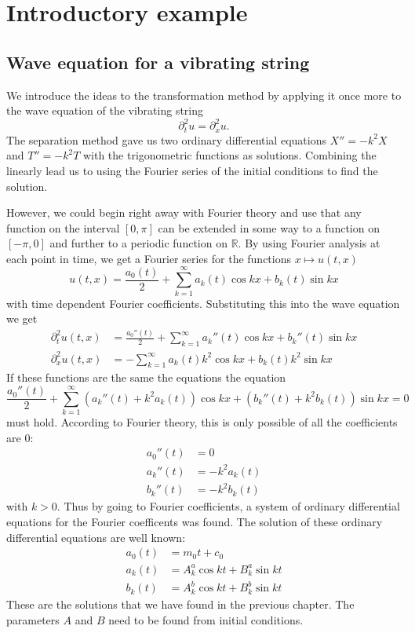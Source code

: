 %
%
%
\section{Introductory example}
\subsection{Wave equation for a vibrating string}
We introduce the ideas to the transformation method by applying it
once more to the wave equation of the vibrating string
\[
\partial_t^2u=\partial_x^2u.
\]
The separation method gave us two ordinary differential equations
$X''=-k^2X$ and $T''=-k^2T$ with the trigonometric functions as
solutions.
Combining the linearly lead us to using the Fourier series of the
initial conditions to find the solution.

However, we could begin right away with Fourier theory and
use that any function on the interval $[0,\pi]$ can be extended
in some way to a function on $[-\pi,0]$ and further to a periodic
function on $\mathbb R$.
By using Fourier analysis at each point in time, we get a
Fourier series for the functions $x\mapsto u(t,x)$
\[
u(t,x)=\frac{a_0(t)}2+\sum_{k=1}^\infty a_k(t)\cos kx+b_k(t)\sin kx
\]
with time dependent Fourier coefficients.
Substituting this into the wave equation we get
\begin{align*}
\partial_t^2u(t,x)&=\frac{a_0''(t)}2
+\sum_{k=1}^\infty a_k''(t)\cos kx+b_k''(t)\sin kx\\
\partial_x^2u(t,x)&=
-\sum_{k=1}^\infty a_k(t)k^2\cos kx+b_k(t)k^2\sin kx
\end{align*}
If these functions are the same the equations
the equation
\[
\frac{a_0''(t)}2
+\sum_{k=1}^\infty (a_k''(t)+k^2a_k(t))\cos kx+(b_k''(t)+k^2b_k(t))\sin kx=0
\]
must hold.
According to Fourier theory, this is only possible of all the coefficients
are $0$:
\begin{align*}
a_0''(t)&=0\\
a_k''(t)&=-k^2a_k(t)\\
b_k''(t)&=-k^2b_k(t)
\end{align*}
with $k>0$.
Thus by going to Fourier coefficients, a system of ordinary differential
equations for the Fourier coefficents was found.
The solution of these ordinary differential equations are well known:
\begin{align*}
a_0(t)&=m_0t+c_0\\
a_k(t)&=A^a_k\cos kt+B^a_k\sin kt\\
b_k(t)&=A^b_k\cos kt+B^b_k\sin kt
\end{align*}
These are the solutions that we have found in the previous chapter.
The parameters $A$ and $B$ need to be found from initial conditions.

